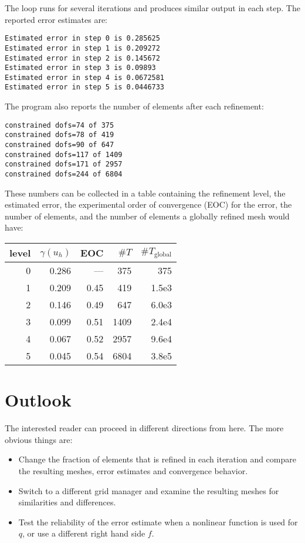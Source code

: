 \documentclass[a4paper,12pt]{article}
\begin{document}
The loop runs for several iterations and produces similar output in
each step. The reported error estimates are:
\begin{lstlisting}[basicstyle=\ttfamily\small,
frame=single,
backgroundcolor=\color{listingbg}]
Estimated error in step 0 is 0.285625
Estimated error in step 1 is 0.209272
Estimated error in step 2 is 0.145672
Estimated error in step 3 is 0.09893
Estimated error in step 4 is 0.0672581
Estimated error in step 5 is 0.0446733
\end{lstlisting}

The program also reports the number of elements after each refinement:
\begin{lstlisting}[basicstyle=\ttfamily\small,
frame=single,
backgroundcolor=\color{listingbg}]
constrained dofs=74 of 375
constrained dofs=78 of 419
constrained dofs=90 of 647
constrained dofs=117 of 1409
constrained dofs=171 of 2957
constrained dofs=244 of 6804
\end{lstlisting}

These numbers can be collected in a table containing the refinement level,
the estimated error, the experimental order of convergence (EOC) for the
error, the number of elements, and the number of elements a globally
refined mesh would have:
\begin{center}
  \begin{tabular}{rrrrr}
    level & $\gamma(u_h)$ & EOC & $\#T$ & $\#T_\text{global}$ \\
    \hline
    0 & 0.286 & ---  &  375 & 375   \\
    1 & 0.209 & 0.45 &  419 & 1.5e3 \\
    2 & 0.146 & 0.49 &  647 & 6.0e3 \\
    3 & 0.099 & 0.51 & 1409 & 2.4e4 \\
    4 & 0.067 & 0.52 & 2957 & 9.6e4 \\
    5 & 0.045 & 0.54 & 6804 & 3.8e5 \\
\end{tabular}
\end{center}

\section{Outlook}

The interested reader can proceed in different directions from here.
The more obvious things are:
\begin{itemize}
\item Change the fraction of elements that is refined in each iteration
  and compare the resulting meshes, error estimates and convergence
  behavior.
\item Switch to a different grid manager and examine the resulting meshes
  for similarities and differences.
\item Test the reliability of the error estimate when a nonlinear function
  is used for $q$, or use a different right hand side $f$.
\end{itemize}

%
%
\end{document}
